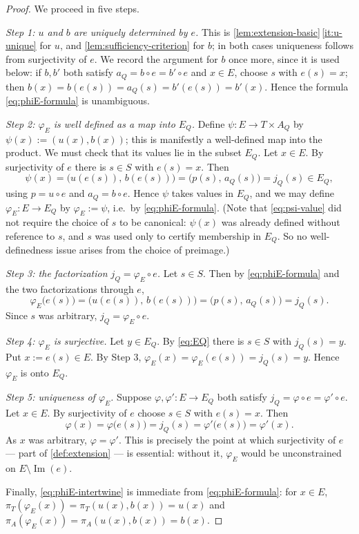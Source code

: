 \documentclass[11pt,reqno]{amsart}
\theoremstyle{plain}
\theoremstyle{definition}
\newcommand{\Src}{S}
\newcommand{\Rdt}{T}
\newcommand{\Img}{\operatorname{Im}}
\begin{document}
\begin{proof}
We proceed in five steps.

\emph{Step 1: $u$ and $b$ are uniquely determined by $e$.} This is
\cref{lem:extension-basic}\,\eqref{it:u-unique} for $u$, and \cref{lem:sufficiency-criterion} for
$b$; in both cases uniqueness follows from surjectivity of $e$. We record the argument for $b$
once more, since it is used below: if $b,b'$ both satisfy $a_Q=b\circ e=b'\circ e$ and $x\in E$,
choose $s$ with $e(s)=x$; then $b(x)=b(e(s))=a_Q(s)=b'(e(s))=b'(x)$. Hence the formula
\eqref{eq:phiE-formula} is unambiguous.

\emph{Step 2: $\varphi_E$ is well defined as a map into $E_Q$.} Define
$\psi\colon E\to\Rdt\times A_Q$ by $\psi(x):=(u(x),b(x))$; this is manifestly a well-defined map
into the product. We must check that its values lie in the subset $E_Q$. Let $x\in E$. By
surjectivity of $e$ there is $s\in\Src$ with $e(s)=x$. Then
\begin{equation}\label{eq:psi-value}
\psi(x)=\bigl(u(e(s)),\,b(e(s))\bigr)=\bigl(p(s),\,a_Q(s)\bigr)=j_Q(s)\in E_Q,
\end{equation}
using $p=u\circ e$ and $a_Q=b\circ e$. Hence $\psi$ takes values in $E_Q$, and we may define
$\varphi_E\colon E\to E_Q$ by $\varphi_E:=\psi$, i.e.\ by \eqref{eq:phiE-formula}. (Note that
\eqref{eq:psi-value} did not require the choice of $s$ to be canonical: $\psi(x)$ was already
defined without reference to $s$, and $s$ was used only to certify membership in $E_Q$. So no
well-definedness issue arises from the choice of preimage.)

\emph{Step 3: the factorization $j_Q=\varphi_E\circ e$.} Let $s\in\Src$. Then by
\eqref{eq:phiE-formula} and the two factorizations through $e$,
\begin{equation*}
\varphi_E\bigl(e(s)\bigr)
=\bigl(u(e(s)),\,b(e(s))\bigr)
=\bigl(p(s),\,a_Q(s)\bigr)
=j_Q(s).
\end{equation*}
Since $s$ was arbitrary, $j_Q=\varphi_E\circ e$.

\emph{Step 4: $\varphi_E$ is surjective.} Let $y\in E_Q$. By \eqref{eq:EQ} there is $s\in\Src$
with $j_Q(s)=y$. Put $x:=e(s)\in E$. By Step 3, $\varphi_E(x)=\varphi_E(e(s))=j_Q(s)=y$. Hence
$\varphi_E$ is onto $E_Q$.

\emph{Step 5: uniqueness of $\varphi_E$.} Suppose $\varphi,\varphi'\colon E\to E_Q$ both satisfy
$j_Q=\varphi\circ e=\varphi'\circ e$. Let $x\in E$. By surjectivity of $e$ choose $s\in\Src$ with
$e(s)=x$. Then
\begin{equation*}
\varphi(x)=\varphi\bigl(e(s)\bigr)=j_Q(s)=\varphi'\bigl(e(s)\bigr)=\varphi'(x).
\end{equation*}
As $x$ was arbitrary, $\varphi=\varphi'$. This is precisely the point at which surjectivity of
$e$ --- part of \cref{def:extension} --- is essential: without it, $\varphi_E$ would be
unconstrained on $E\setminus\Img(e)$.

Finally, \eqref{eq:phiE-intertwine} is immediate from \eqref{eq:phiE-formula}: for $x\in E$,
$\pi_\Rdt(\varphi_E(x))=\pi_\Rdt(u(x),b(x))=u(x)$ and
$\pi_A(\varphi_E(x))=\pi_A(u(x),b(x))=b(x)$.
\end{proof}
\end{document}

